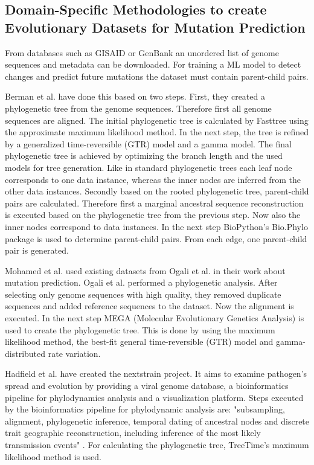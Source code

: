 \subsection{Domain-Specific Methodologies to create Evo\-lu\-tio\-na\-ry Datasets for Mutation Prediction} \label{fundamentalsD}

From databases such as \ac{GISAID} or GenBank an unordered list of genome sequences and metadata can be downloaded. For training a \ac{ML} model to detect changes and predict future mutations the dataset must contain parent-child pairs.

Berman et al. \cite{Berman2020} have done this based on two steps. First, they created a phylogenetic tree from the genome sequences. Therefore first all genome sequences are aligned. The initial phylogenetic tree is calculated by Fasttree using the approximate maximum likelihood method. In the next step, the tree is refined by a generalized time-reversible (GTR) model and a gamma model. The final phylogenetic tree is achieved by optimizing the branch length and the used models for tree generation. Like in standard phylogenetic trees each leaf node corresponds to one data instance, whereas the inner nodes are inferred from the other data instances.
Secondly based on the rooted phylogenetic tree, parent-child pairs are calculated. Therefore first a marginal ancestral sequence reconstruction is executed based on the phylogenetic tree from the previous step. Now also the inner nodes correspond to data instances. In the next step BioPython's \cite{10.1093/bioinformatics/btp163} Bio.Phylo package is used to determine parent-child pairs. From each edge, one parent-child pair is generated. \cite{Berman2020}

Mohamed et al. \cite{Mohamed2021} used existing datasets from Ogali et al. \cite{ogaliMolecularCharacterizationNewcastle2018} in their work about mutation prediction. Ogali et al. \cite{ogaliMolecularCharacterizationNewcastle2018} performed a phylogenetic analysis. After selecting only genome sequences with high quality, they removed duplicate sequences and added reference sequences to the dataset. Now the alignment is executed. In the next step MEGA (Molecular Evo\-lu\-tio\-na\-ry Genetics Analysis) is used to create the phylogenetic tree. This is done by using the maximum likelihood method, the best-fit general time-reversible (GTR) model and gamma-distributed rate variation.

Hadfield et al. \cite{10.1093/bioinformatics/bty407} have created the nextstrain project. It aims to examine pathogen's spread and evolution by providing a viral genome database, a bioinformatics pipeline for phylodynamics analysis and a visualization plat\-form. Steps executed by the bioinformatics pipeline for phylodynamic analysis are: "subsampling, alignment, phylogenetic inference, temporal dating of ancestral nodes and discrete trait geographic reconstruction, including in\-fe\-rence of the most likely transmission events" \cite{10.1093/bioinformatics/bty407}. For calculating the phylogenetic tree, TreeTime's maximum likelihood method is used. \cite{10.1093/bioinformatics/bty407}

